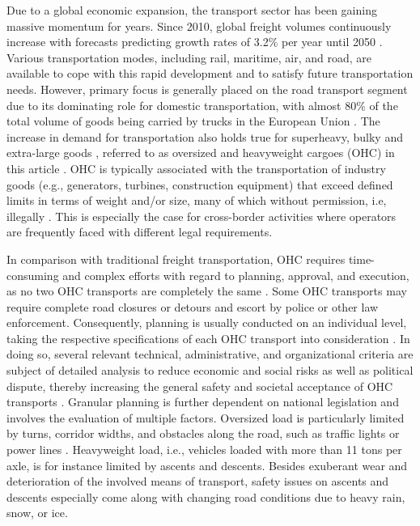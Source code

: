 
Due to a global economic expansion, the transport sector has been gaining massive momentum for years.
Since 2010, global freight volumes continuously increase with forecasts predicting growth rates of 3.2\% per year until 2050 \cite{figura2020preferences, InternationalTransportForum}.
Various transportation modes, including rail, maritime, air, and road, are available to cope with this rapid development and to satisfy future transportation needs.
However, primary focus is generally placed on the road transport segment due to its dominating role for domestic transportation, with almost 80\% of the total volume of goods being carried by trucks in the European Union \cite{Eurostat}.
The increase in demand for transportation also holds true for superheavy, bulky and extra-large goods \cite{gavrilova2021analysis}, referred to as oversized and heavyweight cargoes (OHC) in this article \cite{Luo.2021}.
OHC is typically associated with the transportation of industry goods (e.g., generators, turbines, construction equipment) that exceed defined limits in terms of weight and/or size, many of which without permission, i.e, illegally \cite{fiorillo2016minimizing}. This is especially the case for cross-border activities where operators are frequently faced with different legal requirements. 
\par In comparison with traditional freight transportation, OHC requires time-consuming and complex efforts with regard to planning, approval, and execution, as no two OHC transports are completely the same \cite{Wolnowska.2019}.
Some OHC transports may require complete road closures or detours and escort by police or other law enforcement.
Consequently, planning is usually conducted on an individual level, taking the respective specifications of each OHC transport into consideration \cite{Bazaras.2013}.
In doing so, several relevant technical, administrative, and organizational criteria are subject of detailed analysis to reduce economic and social risks as well as political dispute, thereby increasing the general safety and societal acceptance of OHC transports \cite{Palsaitis.2012}.
Granular planning is further dependent on national legislation and involves the evaluation of multiple factors. Oversized load is particularly limited by turns, corridor widths, and obstacles along the road, such as traffic lights or power lines \cite{PETRASKA.2018, arentze2012context}. Heavyweight load, i.e., vehicles loaded with more than 11 tons per axle, is for instance limited by ascents and descents. Besides exuberant wear and deterioration of the involved means of transport, safety issues on ascents and descents especially come along with changing road conditions due to heavy rain, snow, or ice.
